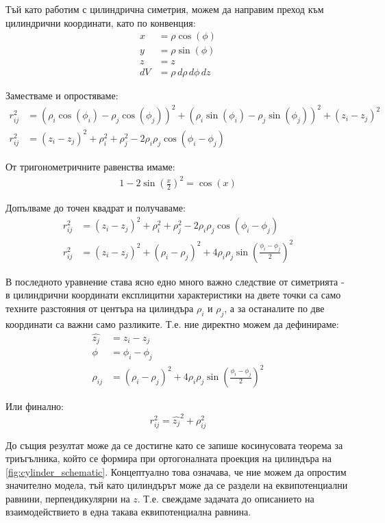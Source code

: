Тъй като работим с цилиндрична симетрия, можем да направим преход към цилиндрични координати, като по конвенция:
\begin{align*}
    x &= \rho \cos(\phi) \\
    y &= \rho \sin(\phi) \\
    z &= z \\
    dV &= \rho \,d\rho \,d\phi \,dz
\end{align*}

Заместваме и опростяваме:
\begin{align*}
    r_{ij}^2 &= (\rho_{i}\cos(\phi_{i}) - \rho_{j}\cos(\phi_{j}))^2 + (\rho_{i}\sin(\phi_{i}) - \rho_{j}\sin(\phi_{j}))^2 + (z_i - z_j)^2 \\
    r_{ij}^2 &= (z_i - z_j)^2 + \rho_{i}^2 + \rho_{j}^2 - 2\rho_{i}\rho_{j}\cos{(\phi_i - \phi_j)}
\end{align*}

От тригонометричните равенства имаме:
\begin{align*}
    1-2 \sin{\left(\frac{x}{2}\right)}^2=\cos (x)
\end{align*}

Допълваме до точен квадрат и получаваме:
\begin{align*}
    r_{ij}^2 &= (z_i - z_j)^2 + \rho_{i}^2 + \rho_{j}^2 - 2\rho_{i}\rho_{j}\cos{(\phi_i - \phi_j)} \\
    r_{ij}^2 &= (z_i - z_j)^2  + (\rho_i - \rho_j)^2 + 4 \rho_i \rho_j \sin{\left( \frac{\phi_i-\phi_j}{2} \right)}^2
\end{align*}

В последното уравнение става ясно едно много важно следствие от симетрията - в цилиндрични координати експлицитни характеристики на двете точки са само техните разстояния от центъра на 
цилиндъра $\rho_{i}$ и $\rho_j$, а за останалите по две координати са важни само разликите. Т.е. ние директно можем да дефинираме:
\begin{align*}
    \hat{z_j} &= z_i - z_j \\
    \phi &= \phi_i - \phi_j \\
    \rho_{ij} &= (\rho_i - \rho_j)^2 + 4 \rho_i \rho_j \sin{\left( \frac{\phi_i-\phi_j}{2} \right)}^2
\end{align*}

Или финално:
\begin{equation}
    \label{eq:cylindricalcoords}
    r_{ij}^2 =  \hat{z_{j}}^2 + \rho_{ij}^2
\end{equation}

До същия резултат може да се достигне като се запише косинусовата теорема за триъгълника, който се формира при ортогоналната проекция на цилиндъра на \autoref{fig:cylinder_schematic}.
Концептуално това означава, че ние можем да опростим значително модела, тъй като цилиндърът може да се раздели на еквипотенциални равнини, перпендикулярни на $z$. Т.е. свеждаме задачата
до описанието на взаимодействието в една такава еквипотенциална равнина.

